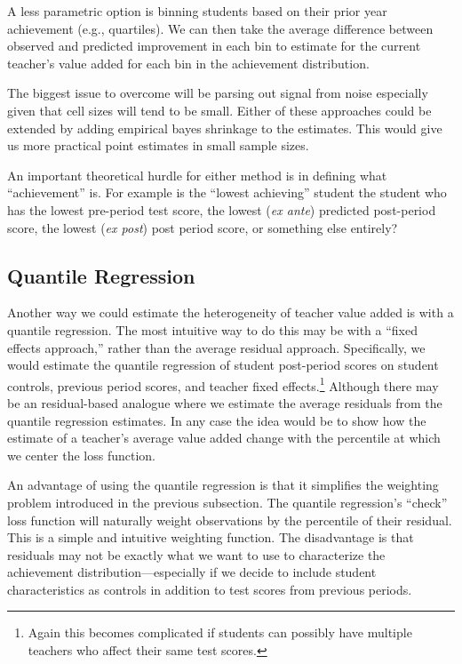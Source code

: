 \documentclass[letterpaper,12pt]{article}
\begin{document}
A less parametric option is binning students based on their prior year achievement (e.g., quartiles). We can then take the average difference between observed and predicted improvement in each bin to estimate for the current teacher's value added for each bin in the achievement distribution.

The biggest issue to overcome will be parsing out signal from noise especially given that cell sizes will tend to be small. Either of these approaches could be extended by adding empirical bayes shrinkage to the estimates. This would give us more practical point estimates in small sample sizes. 

An important theoretical hurdle for either  method is in defining what ``achievement'' is. For example is the ``lowest achieving'' student the student who has the lowest pre-period test score, the lowest (\textit{ex ante}) predicted post-period score, the lowest (\textit{ex post}) post period score,  or something else entirely? 


\subsection{Quantile Regression}
Another way we could estimate the heterogeneity of teacher value added is with a quantile regression. The most intuitive way to do this may be with a ``fixed effects approach,'' rather than the average residual approach. Specifically, we would estimate the quantile regression of student post-period scores on student controls, previous period scores, and teacher fixed effects.\footnote{Again this becomes complicated if students can possibly have multiple teachers who affect their same test scores.} Although there may be an residual-based analogue where we estimate the average residuals from the quantile regression estimates. In any case the idea would be to show how the estimate of a teacher's average value added change with the percentile at which we center the loss function. 

An advantage of using the quantile regression is that it simplifies the weighting problem introduced in the previous subsection. The quantile regression's ``check'' loss function will naturally weight observations by the percentile of their residual. This is a simple and intuitive weighting function. The disadvantage is that residuals may not be exactly what we want to use to characterize the achievement distribution---especially if we decide to include student characteristics as controls in addition to test scores from previous periods.
\end{document}
